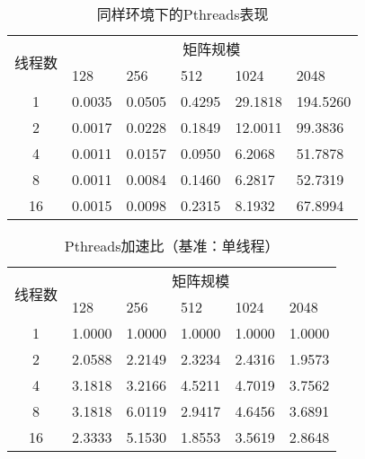 \documentclass{SYSUReport}
\begin{document}
\begin{table}[H]
    \centering
    \caption{同样环境下的Pthreads表现}
    \label{表4}
    \begin{tabular}{|c|lllll|}
    \hline
    \multirow{2}{*}{线程数} & \multicolumn{5}{c|}{矩阵规模}                                                                        \\ \cline{2-6} 
        & \multicolumn{1}{l|}{128} & \multicolumn{1}{l|}{256} & \multicolumn{1}{l|}{512} & \multicolumn{1}{l|}{1024} & 2048 \\ \hline
    1                    & \multicolumn{1}{l|}{0.0035} & \multicolumn{1}{l|}{0.0505} & \multicolumn{1}{l|}{0.4295} & \multicolumn{1}{l|}{29.1818} & 194.5260 \\ \hline
    2                    & \multicolumn{1}{l|}{0.0017} & \multicolumn{1}{l|}{0.0228} & \multicolumn{1}{l|}{0.1849} & \multicolumn{1}{l|}{12.0011} & 99.3836 \\ \hline
    4                    & \multicolumn{1}{l|}{0.0011} & \multicolumn{1}{l|}{0.0157} & \multicolumn{1}{l|}{0.0950} & \multicolumn{1}{l|}{6.2068} & 51.7878 \\ \hline
    8                    & \multicolumn{1}{l|}{0.0011} & \multicolumn{1}{l|}{0.0084} & \multicolumn{1}{l|}{0.1460} & \multicolumn{1}{l|}{6.2817} & 52.7319 \\ \hline
    16                   & \multicolumn{1}{l|}{0.0015} & \multicolumn{1}{l|}{0.0098} & \multicolumn{1}{l|}{0.2315} & \multicolumn{1}{l|}{8.1932} & 67.8994 \\ \hline
    \end{tabular}
    \end{table}
    \begin{table}[H]
        \centering
        \caption{Pthreads加速比（基准：单线程）}
        \label{表5}
        \begin{tabular}{|c|lllll|}
        \hline
        \multirow{2}{*}{线程数} & \multicolumn{5}{c|}{矩阵规模} \\ \cline{2-6} 
         & \multicolumn{1}{l|}{128} & \multicolumn{1}{l|}{256} & \multicolumn{1}{l|}{512} & \multicolumn{1}{l|}{1024} & 2048 \\ \hline
        1  & \multicolumn{1}{l|}{1.0000} & \multicolumn{1}{l|}{1.0000} & \multicolumn{1}{l|}{1.0000} & \multicolumn{1}{l|}{1.0000} & 1.0000 \\ \hline
        2  & \multicolumn{1}{l|}{2.0588} & \multicolumn{1}{l|}{2.2149} & \multicolumn{1}{l|}{2.3234} & \multicolumn{1}{l|}{2.4316} & 1.9573 \\ \hline
        4  & \multicolumn{1}{l|}{3.1818} & \multicolumn{1}{l|}{3.2166} & \multicolumn{1}{l|}{4.5211} & \multicolumn{1}{l|}{4.7019} & 3.7562 \\ \hline
        8  & \multicolumn{1}{l|}{3.1818} & \multicolumn{1}{l|}{6.0119} & \multicolumn{1}{l|}{2.9417} & \multicolumn{1}{l|}{4.6456} & 3.6891 \\ \hline
        16 & \multicolumn{1}{l|}{2.3333} & \multicolumn{1}{l|}{5.1530} & \multicolumn{1}{l|}{1.8553} & \multicolumn{1}{l|}{3.5619} & 2.8648 \\ \hline
        \end{tabular}
        \end{table}
\end{document}
